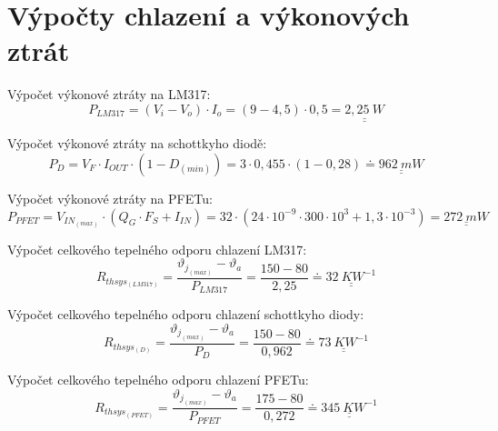 \clearpage
\section{Výpočty chlazení a výkonových ztrát}

\indent\indent Výpočet výkonové ztráty na LM317:
\begin{equation}
P_{LM317} = (V_i - V_o) \cdot I_o = (9 - 4,5) \cdot 0,5 = \underline{\underline{2,25~W}}
\nonumber
\end{equation}

Výpočet výkonové ztráty na schottkyho diodě:
\begin{equation}
P_{D} = V_F \cdot I_{OUT} \cdot \left(1-D_{(min)} \right) = 3 \cdot 0,455 \cdot (1-0,28) \doteq \underline{\underline{962~mW}}
\nonumber
\end{equation}

Výpočet výkonové ztráty na PFETu:
\begin{equation}
P_{PFET} = V_{IN_{(max)}} \cdot \left( Q_G \cdot F_S + I_{IN}\right) = 32 \cdot (24 \cdot 10^{-9} \cdot 300 \cdot 10^{3} + 1,3 \cdot 10^{-3}) = \underline{\underline{272~mW}}
\nonumber
\end{equation}

Výpočet celkového tepelného odporu chlazení LM317:
\begin{equation}
R_{thsys_{(LM317)}} = \dfrac{\vartheta_{j_{(max)}} - \vartheta_a}{P_{LM317}} = \dfrac{150 - 80}{2,25} \doteq \underline{\underline{32~KW^{-1}}}
\nonumber
\end{equation}

Výpočet celkového tepelného odporu chlazení schottkyho diody:
\begin{equation}
R_{thsys_{(D)}} = \dfrac{\vartheta_{j_{(max)}} - \vartheta_a}{P_{D}} = \dfrac{150 - 80}{0,962} \doteq \underline{\underline{73~KW^{-1}}}
\nonumber
\end{equation}

Výpočet celkového tepelného odporu chlazení PFETu:
\begin{equation}
R_{thsys_{(PFET)}} = \dfrac{\vartheta_{j_{(max)}} - \vartheta_a}{P_{PFET}} = \dfrac{175 - 80}{0,272} \doteq \underline{\underline{345~KW^{-1}}}
\nonumber
\end{equation}


